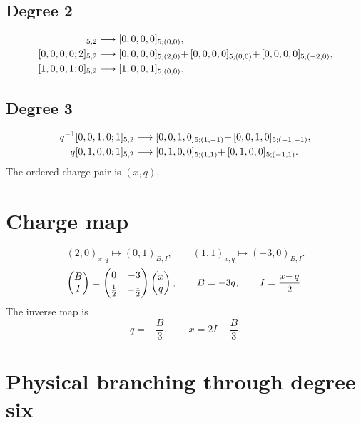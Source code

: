 \documentclass[11pt]{article}
\begin{document}
\subsection*{Degree 2}
\begin{align*}
[0,0,0,0;0]_{5,2}
&\longrightarrow [0,0,0,0]_{5;(0,0)},\\
[0,0,0,0;2]_{5,2}
&\longrightarrow [0,0,0,0]_{5;(2,0)}
\QFFFplus [0,0,0,0]_{5;(0,0)}
\QFFFplus [0,0,0,0]_{5;(-2,0)},\\
[1,0,0,1;0]_{5,2}
&\longrightarrow [1,0,0,1]_{5;(0,0)}.
\end{align*}

\subsection*{Degree 3}
\begin{align*}
q^{-1}[0,0,1,0;1]_{5,2}
&\longrightarrow [0,0,1,0]_{5;(1,-1)}
\allowbreak\mathord{+}\nobreak\, [0,0,1,0]_{5;(-1,-1)},\\
q[0,1,0,0;1]_{5,2}
&\longrightarrow [0,1,0,0]_{5;(1,1)}
\allowbreak\mathord{+}\nobreak\, [0,1,0,0]_{5;(-1,1)}.
\end{align*}
The ordered charge pair is $(x,q)$.

\section{Charge map}
\[
(2,0)_{x,q}\longmapsto(0,1)_{B,I},
\qquad
(1,1)_{x,q}\longmapsto(-3,0)_{B,I}.
\]
\begin{equation}
\begin{pmatrix}B\\ I\end{pmatrix}
=
\begin{pmatrix}
0&-3\\[1mm]
\frac12&-\frac12
\end{pmatrix}
\begin{pmatrix}x\\ q\end{pmatrix},
\qquad
B=-3q,
\qquad
I=\frac{x\allowbreak\mathord{-}\nobreak\, q}{2}.
\end{equation}
The inverse map is
\[
q=-\frac{B}{3},
\qquad
x=2I-\frac{B}{3}.
\]

\section{Physical branching through degree six}
{\small}

\BeginQFFFAppendices
\end{document}
